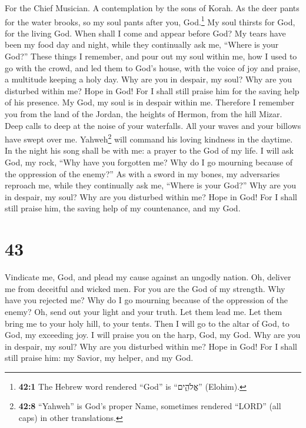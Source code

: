 For the Chief Musician. A contemplation by the sons of Korah.
 As the deer pants for the water brooks, so my soul pants
after you, God.\footnote{\textbf{42:1} The Hebrew word rendered ``God''
  is ``אֱלֹהִ֑ים'' (Elohim).}  My soul thirsts for God,
for the living God. When shall I come and appear before God?
 My tears have been my food day and night, while they
continually ask me, ``Where is your God?''  These things I
remember, and pour out my soul within me, how I used to go with the
crowd, and led them to God's house, with the voice of joy and praise, a
multitude keeping a holy day.  Why are you in despair, my
soul? Why are you disturbed within me? Hope in God! For I shall still
praise him for the saving help of his presence.  My God,
my soul is in despair within me. Therefore I remember you from the land
of the Jordan, the heights of Hermon, from the hill Mizar.
 Deep calls to deep at the noise of your waterfalls. All
your waves and your billows have swept over me. 
Yahweh\footnote{\textbf{42:8} ``Yahweh'' is God's proper Name, sometimes
  rendered ``LORD'' (all caps) in other translations.} will command his
loving kindness in the daytime. In the night his song shall be with me:
a prayer to the God of my life.  I will ask God, my rock,
``Why have you forgotten me? Why do I go mourning because of the
oppression of the enemy?''  As with a sword in my bones,
my adversaries reproach me, while they continually ask me, ``Where is
your God?''  Why are you in despair, my soul? Why are you
disturbed within me? Hope in God! For I shall still praise him, the
saving help of my countenance, and my God.

\hypertarget{section-42}{%
\section{43}\label{section-42}}

 Vindicate me, God, and plead my cause against an ungodly
nation. Oh, deliver me from deceitful and wicked men.  For
you are the God of my strength. Why have you rejected me? Why do I go
mourning because of the oppression of the enemy?  Oh, send
out your light and your truth. Let them lead me. Let them bring me to
your holy hill, to your tents.  Then I will go to the
altar of God, to God, my exceeding joy. I will praise you on the harp,
God, my God.  Why are you in despair, my soul? Why are you
disturbed within me? Hope in God! For I shall still praise him: my
Savior, my helper, and my God.

